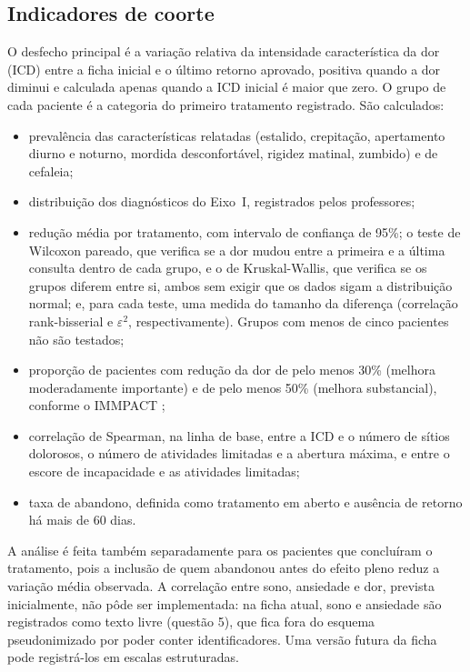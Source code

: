 \subsection{Indicadores de coorte}

O desfecho principal é a variação relativa da intensidade característica da dor (ICD) entre a ficha inicial e o último retorno aprovado, positiva quando a dor diminui e calculada apenas quando a ICD inicial é maior que zero. O grupo de cada paciente é a categoria do primeiro tratamento registrado. São calculados:

\begin{itemize}
	\item prevalência das características relatadas (estalido, crepitação, apertamento diurno e noturno, mordida desconfortável, rigidez matinal, zumbido) e de cefaleia;
	\item distribuição dos diagnósticos do Eixo~I, registrados pelos professores;
	\item redução média por tratamento, com intervalo de confiança de 95\%; o teste de Wilcoxon pareado, que verifica se a dor mudou entre a primeira e a última consulta dentro de cada grupo, e o de Kruskal-Wallis, que verifica se os grupos diferem entre si, ambos sem exigir que os dados sigam a distribuição normal; e, para cada teste, uma medida do tamanho da diferença (correlação rank-bisserial e $\varepsilon^2$, respectivamente). Grupos com menos de cinco pacientes não são testados;
	\item proporção de pacientes com redução da dor de pelo menos 30\% (melhora moderadamente importante) e de pelo menos 50\% (melhora substancial), conforme o IMMPACT \cite{dworkin2008};
	\item correlação de Spearman, na linha de base, entre a ICD e o número de sítios dolorosos, o número de atividades limitadas e a abertura máxima, e entre o escore de incapacidade e as atividades limitadas;
	\item taxa de abandono, definida como tratamento em aberto e ausência de retorno há mais de 60 dias.
\end{itemize}

A análise é feita também separadamente para os pacientes que concluíram o tratamento, pois a inclusão de quem abandonou antes do efeito pleno reduz a variação média observada. A correlação entre sono, ansiedade e dor, prevista inicialmente, não pôde ser implementada: na ficha atual, sono e ansiedade são registrados como texto livre (questão 5), que fica fora do esquema pseudonimizado por poder conter identificadores. Uma versão futura da ficha pode registrá-los em escalas estruturadas.

